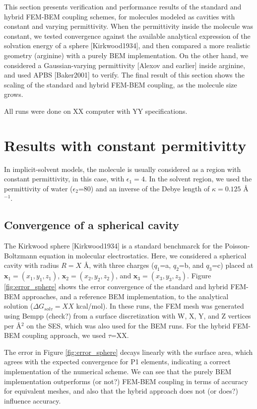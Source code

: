 This section presents verification and performance results of the standard and hybrid FEM-BEM coupling schemes, for molecules modeled as cavities with constant and varying permittivity.
When the permittivity inside the molecule was constant, we tested convergence against the available analytical expression of the solvation energy of a sphere [Kirkwood1934], and then compared a more realistic geometry (arginine) with a purely BEM implementation.
On the other hand, we considered a Gaussian-varying permittivity [Alexov and earlier] inside arginine, and used APBS [Baker2001] to verify.
The final result of this section shows the scaling of the standard and hybrid FEM-BEM coupling, as the molecule size grows. 

All runs were done on XX computer with YY specifications. 

\section*{\sffamily \Large Results with constant permitivitty}

In implicit-solvent models, the molecule is usually considered as a region with constant permittivity, in this case, with $\epsilon_1=4$.
In the solvent region, we used the permittivity of water ($\epsilon_2$=80) and an inverse of the Debye length of $\kappa=0.125$ \AA$^{-1}$.

\subsection*{\sffamily \large Convergence of a spherical cavity}

The Kirkwood sphere [Kirkwood1934] is a standard benchmarck for the Poisson-Boltzmann equation in molecular electrostatics. 
Here, we considered a spherical cavity with radius $R=X$ \AA, with three charges ($q_1$=a, $q_2$=b, and $q_3$=c) placed at $\mathbf{x}_1=(x_1,y_1,z_1)$, $\mathbf{x}_2=(x_2,y_2,z_2)$, and $\mathbf{x}_3=(x_3,y_3,z_3)$.
Figure \ref{fig:error_sphere} shows the error convergence of the standard and hybrid FEM-BEM approaches, and a reference BEM implementation, to the analytical solution ($\Delta G_{solv}=XX$ kcal/mol). 
In these runs, the FEM mesh was generated using Bempp (check?) from a surface discretization with W, X, Y, and Z vertices per \AA$^2$ on the SES, which was also used for the BEM runs. 
For the hybrid FEM-BEM coupling approach, we used $\tau$=XX.

The error in Figure \ref{fig:error_sphere} decays linearly with the surface area, which agrees with the expected convergence for P1 elements, indicating a correct implementation of the numerical scheme. 
We can see that the purely BEM implementation outperforms (or not?) FEM-BEM coupling in terms of accuracy for equivalent meshes, and also that the hybrid approach does not (or does?) influence accuracy. 

